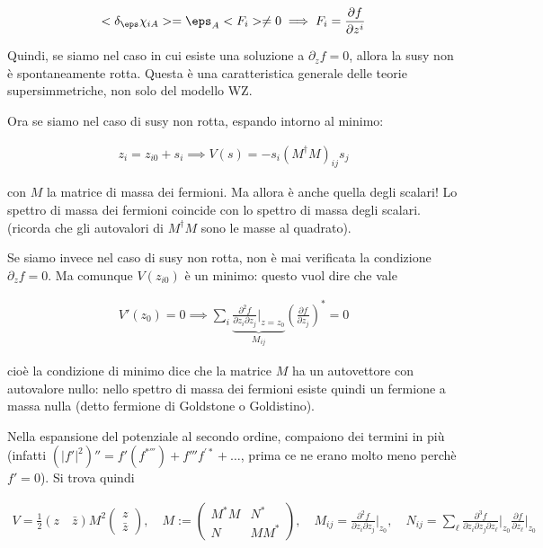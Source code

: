 \documentclass{report}
\begin{document}
\begin{align}
    <\delta_\eps \chi_{iA}> = \eps_A <F_i> \neq 0 \implies F_i = \frac{\partial f}{\partial z^i}
\end{align}

Quindi, se siamo nel caso in cui esiste una soluzione a \(\partial_z f = 0\), allora la susy non è spontaneamente rotta. Questa è una caratteristica generale delle teorie supersimmetriche, non solo del modello WZ. 

Ora se siamo nel caso di susy non rotta, espando intorno al minimo:     

\begin{align}
    z_i = z_{i0} + s_i \implies V(s) = -s_i (M^\dagger M)_{ij}s_j 
\end{align}

con \(M\) la matrice di massa dei fermioni. Ma allora è anche quella degli scalari! Lo spettro di massa dei fermioni coincide con lo spettro di massa degli scalari. (ricorda che gli autovalori di \(M^\dagger M\) sono le masse al quadrato). 

Se siamo invece nel caso di susy non rotta, non è mai verificata la condizione \(\partial_z f = 0\). Ma comunque \(V(z_{i0})\) è un minimo: questo vuol dire che vale 

\begin{align}
    V'(z_{0}) = 0 \implies \sum_i \underbrace{\frac{\partial^2 f}{\partial z_i \partial z_j}\biggr|_{z=z_0}}_{M_{ij}}\left( \frac{\partial f}{\partial z_j} \right)^* = 0 
\end{align}

cioè la condizione di minimo dice che la matrice \(M\) ha un autovettore con autovalore nullo: nello spettro di massa dei fermioni esiste quindi un fermione a massa nulla (detto fermione di Goldstone o Goldistino).

Nella espansione del potenziale al secondo ordine, compaiono dei termini in più (infatti \((|f'|^2)'' = f'(f^{*'''}) + f'''f^{'*} + \ldots\), prima ce ne erano molto meno perchè \(f' =0\)). Si trova quindi 

\begin{align}
    V = \frac{1}{2}(z \quad \bar{z})M^2 \begin{pmatrix}
        z \\ \bar{z}
    \end{pmatrix}, \quad M := \begin{pmatrix}
        M^*M & N^* \\ N & MM^*
    \end{pmatrix}, \quad M_{ij} = \frac{\partial^2 f}{\partial z_i \partial z_j}\biggr|_{z_0}, \quad N_{ij} = \sum_\ell \frac{\partial^3 f}{\partial z_i \partial z_j \partial z_\ell}\biggr|_{z_0}\frac{\partial f}{\partial z_\ell}\biggr|_{z_0}
\end{align}
\end{document}
